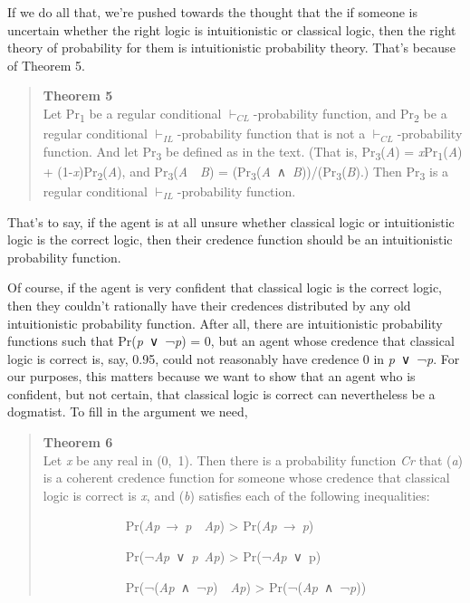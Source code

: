 \documentclass[
  10pt,
  letterpaper,
  DIV=11,
  numbers=noendperiod,
  twoside]{scrartcl}
\begin{document}
If we do all that, we're pushed towards the thought that the if someone
is uncertain whether the right logic is intuitionistic or classical
logic, then the right theory of probability for them is intuitionistic
probability theory. That's because of Theorem 5.

\begin{quote}
\textbf{Theorem 5}\\
Let Pr\textsubscript{1} be a regular conditional
\(\vdash_{CL}\)-probability function, and Pr\textsubscript{2} be a
regular conditional \(\vdash_{IL}\)-probability function that is not a
\(\vdash_{CL}\)-probability function. And let Pr\textsubscript{3} be
defined as in the text. (That is, Pr\textsubscript{3}(\emph{A}) =
\emph{x}Pr\textsubscript{1}(\emph{A}) +
(1-\emph{x})Pr\textsubscript{2}(\emph{A}), and
Pr\textsubscript{3}(\emph{A}~\textbar~\emph{B}) =
(Pr\textsubscript{3}(\emph{A}~∧~\emph{B}))/(Pr\textsubscript{3}(\emph{B}).)
Then Pr\textsubscript{3} is a regular conditional
\(\vdash_{IL}\)-probability function.
\end{quote}

That's to say, if the agent is at all unsure whether classical logic or
intuitionistic logic is the correct logic, then their credence function
should be an intuitionistic probability function.

Of course, if the agent is very confident that classical logic is the
correct logic, then they couldn't rationally have their credences
distributed by any old intuitionistic probability function. After all,
there are intuitionistic probability functions such that
Pr(\emph{p}~∨~¬\emph{p}) = 0, but an agent whose credence that classical
logic is correct is, say, 0.95, could not reasonably have credence 0 in
\emph{p}~∨~¬\emph{p}. For our purposes, this matters because we want to
show that an agent who is confident, but not certain, that classical
logic is correct can nevertheless be a dogmatist. To fill in the
argument we need,

\begin{quote}
\textbf{Theorem 6}\\
Let \emph{x} be any real in (0,~1). Then there is a probability function
\emph{Cr} that (\emph{a}) is a coherent credence function for someone
whose credence that classical logic is correct is \emph{x}, and
(\emph{b}) satisfies each of the following inequalities:

~~~~~~~~~~~~~Pr(\emph{Ap}~→~\emph{p}~\textbar~\emph{Ap}) \textgreater{}
Pr(\emph{Ap}~→~\emph{p})\\
\strut ~~~~~~~~~~~~~Pr(¬\emph{Ap}~∨~\emph{p}\textbar~\emph{Ap})
\textgreater{} Pr(¬\emph{Ap}~∨~p)\\
\strut ~~~~~~~~~~~~~Pr(¬(\emph{Ap}~∧~¬\emph{p})~\textbar~\emph{Ap})
\textgreater{} Pr(¬(\emph{Ap}~∧~¬\emph{p}))
\end{quote}
\end{document}
